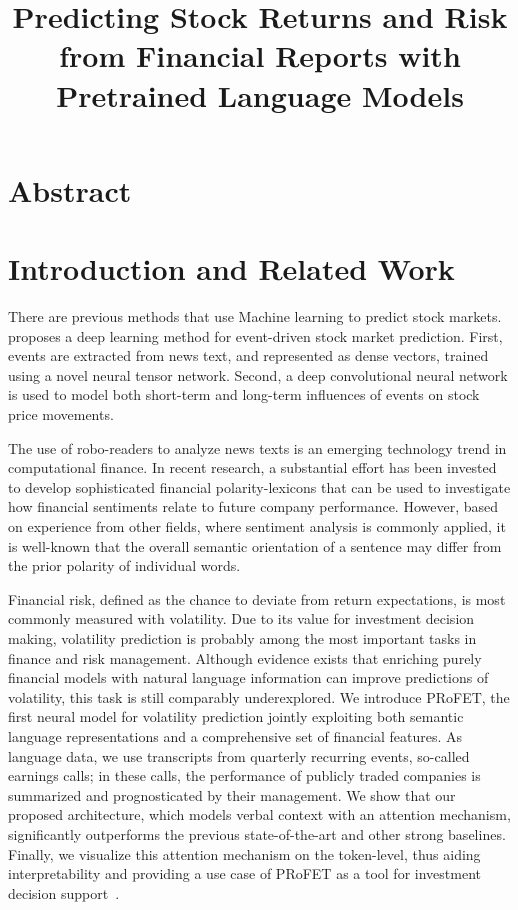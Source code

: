 \documentclass[11pt]{article}
\title{\vspace{-4cm} Predicting Stock Returns and Risk from Financial Reports with Pretrained Language Models}
\author{}
\date{}
\begin{document}
\maketitle

\section{Abstract}

\section{Introduction and Related Work}

There are previous methods that use Machine learning to predict stock
markets.~\cite{ding2015} proposes a deep learning method for
event-driven stock market prediction. First, events are extracted from news text, and represented as dense vectors,
trained using a novel neural tensor network. Second, a deep convolutional neural network is used to model both short-term and
long-term influences of events on stock price movements.

The use of robo-readers to analyze news texts is an emerging technology trend in computational finance. In recent
research, a substantial effort has been invested to develop sophisticated financial polarity-lexicons that can be used to
investigate how financial sentiments relate to future company performance. However, based on experience from other
fields, where sentiment analysis is commonly applied, it is well-known
that the overall semantic orientation of a sentence may differ from the prior polarity of individual words.

Financial risk, defined as the chance to deviate from return expectations, is most commonly measured
with volatility. Due to its value for investment decision making, volatility prediction is probably
among the most important tasks in finance and risk management. Although evidence exists that enriching purely financial models with natural language
information can improve predictions of volatility, this task is still comparably underexplored. We introduce PRoFET, the
first neural model for volatility prediction jointly exploiting both
semantic language representations and a comprehensive set of financial
features. As language data, we use transcripts from quarterly
recurring events, so-called earnings calls; in these calls, the performance of publicly traded companies is summarized and prognosticated by their management. We show that our
proposed architecture, which models verbal context with an attention mechanism, significantly outperforms the previous state-of-the-art and other strong
baselines. Finally, we visualize this attention mechanism on the token-level, thus aiding interpretability and providing a use case of PRoFET as a tool
for investment decision support~\cite{theil2019}.
\end{document}
